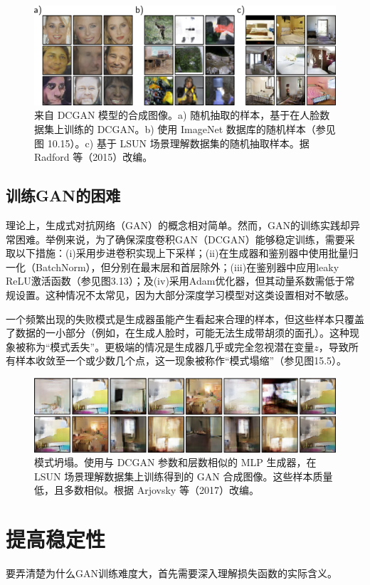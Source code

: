 \begin{figure}[ht!]
\centering
\includegraphics[width=0.7\linewidth]{png/chapter15/GANDCGANResults.png}
\caption{来自 DCGAN 模型的合成图像。a) 随机抽取的样本，基于在人脸数据集上训练的 DCGAN。b) 使用 ImageNet 数据库的随机样本（参见图 10.15）。c) 基于 LSUN 场景理解数据集的随机抽取样本。据 Radford 等（2015）改编。}
\end{figure}

\subsection{训练GAN的困难}
理论上，生成式对抗网络（GAN）的概念相对简单。然而，GAN的训练实践却异常困难。举例来说，为了确保深度卷积GAN（DCGAN）能够稳定训练，需要采取以下措施：(i)采用步进卷积实现上下采样；(ii)在生成器和鉴别器中使用批量归一化（BatchNorm），但分别在最末层和首层除外；(iii)在鉴别器中应用leaky ReLU激活函数（参见图3.13）；及(iv)采用Adam优化器，但其动量系数需低于常规设置。这种情况不太常见，因为大部分深度学习模型对这类设置相对不敏感。

一个频繁出现的失败模式是生成器虽能产生看起来合理的样本，但这些样本只覆盖了数据的一小部分（例如，在生成人脸时，可能无法生成带胡须的面孔）。这种现象被称为“模式丢失”。更极端的情况是生成器几乎或完全忽视潜在变量\(z\)，导致所有样本收敛至一个或少数几个点，这一现象被称作“模式塌缩”（参见图15.5）。

\begin{figure}[ht!]
\centering
\includegraphics[width=0.7\linewidth]{png/chapter15/GANModeCollapse.png}
\caption{模式坍塌。使用与 DCGAN 参数和层数相似的 MLP 生成器，在 LSUN 场景理解数据集上训练得到的 GAN 合成图像。这些样本质量低，且多数相似。根据 Arjovsky 等（2017）改编。}
\end{figure}


\section{提高稳定性}
要弄清楚为什么GAN训练难度大，首先需要深入理解损失函数的实际含义。

